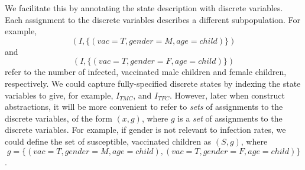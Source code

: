 We facilitate this by annotating the state description with discrete variables.
Each assignment to the discrete variables describes a different subpopulation.
For example, $$(I, \{(vac=T,
	gender=M, age=child)\})$$ and $$(I, \{(vac=T, gender=F, age=child)\})$$ refer to
the number of infected, vaccinated male children and female children, respectively.  We could
capture fully-specified discrete states by indexing the state variables to give, for example,
$I_{TMC}$, and $I_{TFC}$.
However, later when construct abstractions, it will be more convenient to refer to \emph{sets} of assignments to the discrete variables, of the form $(x, g)$, where $g$ is a \emph{set} of assignments to the discrete variables.
For example, if gender is not relevant to infection
rates, we could define the set of susceptible, vaccinated children as $(S, g)$, where $$g=
	\{(vac=T, gender=M, age=child), (vac=T, gender=F, age=child)\}$$.

